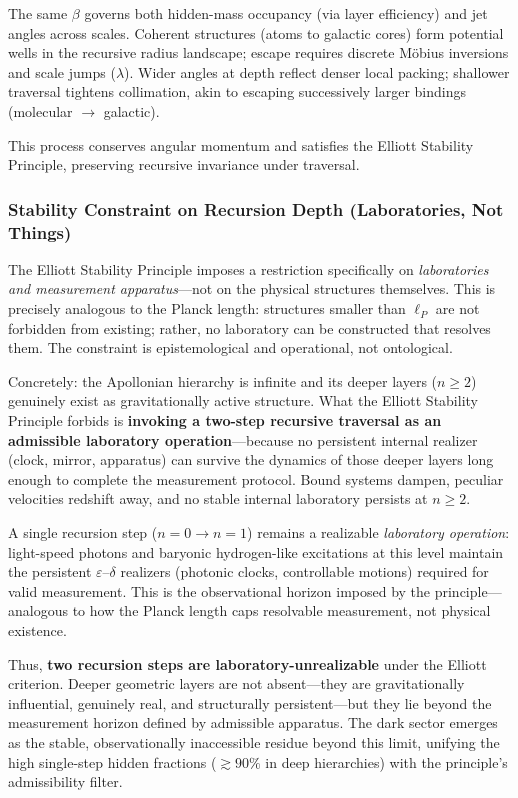 \documentclass[11pt,a4paper]{article}
\begin{document}
The same $\beta$ governs both hidden-mass occupancy (via layer efficiency) and jet angles across scales. Coherent structures (atoms to galactic cores) form potential wells in the recursive radius landscape; escape requires discrete M\"obius inversions and scale jumps ($\lambda$). Wider angles at depth reflect denser local packing; shallower traversal tightens collimation, akin to escaping successively larger bindings (molecular $\to$ galactic).

This process conserves angular momentum and satisfies the Elliott Stability Principle, preserving recursive invariance under traversal.

\subsubsection{Stability Constraint on Recursion Depth (Laboratories, Not Things)}
The Elliott Stability Principle imposes a restriction specifically on \emph{laboratories and measurement apparatus}---not on the physical structures themselves. This is precisely analogous to the Planck length: structures smaller than $\ell_P$ are not forbidden from existing; rather, no laboratory can be constructed that resolves them. The constraint is epistemological and operational, not ontological.

Concretely: the Apollonian hierarchy is infinite and its deeper layers ($n \geq 2$) genuinely exist as gravitationally active structure. What the Elliott Stability Principle forbids is \textbf{invoking a two-step recursive traversal as an admissible laboratory operation}---because no persistent internal realizer (clock, mirror, apparatus) can survive the dynamics of those deeper layers long enough to complete the measurement protocol. Bound systems dampen, peculiar velocities redshift away, and no stable internal laboratory persists at $n \geq 2$.

A single recursion step ($n=0 \to n=1$) remains a realizable \emph{laboratory operation}: light-speed photons and baryonic hydrogen-like excitations at this level maintain the persistent $\varepsilon$--$\delta$ realizers (photonic clocks, controllable motions) required for valid measurement. This is the observational horizon imposed by the principle---analogous to how the Planck length caps resolvable measurement, not physical existence.

Thus, \textbf{two recursion steps are laboratory-unrealizable} under the Elliott criterion. Deeper geometric layers are not absent---they are gravitationally influential, genuinely real, and structurally persistent---but they lie beyond the measurement horizon defined by admissible apparatus. The dark sector emerges as the stable, observationally inaccessible residue beyond this limit, unifying the high single-step hidden fractions ($\gtrsim 90\%$ in deep hierarchies) with the principle's admissibility filter.
\end{document}
